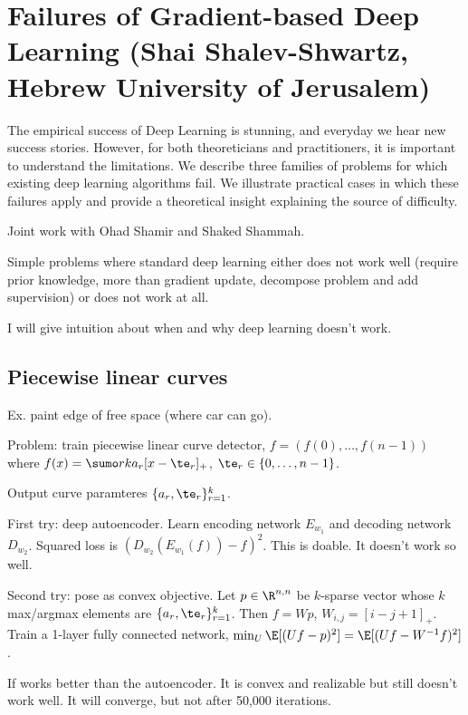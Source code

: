 \section{Failures of Gradient-based Deep Learning (Shai Shalev-Shwartz, Hebrew University of Jerusalem)}

The empirical success of Deep Learning is stunning, and everyday we hear new success stories. However, for both theoreticians and practitioners, it is important to understand the limitations. We describe three families of problems for which existing deep learning algorithms fail. We illustrate practical cases in which these failures apply and provide a theoretical insight explaining the source of difficulty.   
 
Joint work with Ohad Shamir and Shaked Shammah.

Simple problems where standard deep learning either does not work well (require prior knowledge, more than gradient update, decompose problem and add supervision) or does not work at all.

I will give intuition about when and why deep learning doesn't work.

\subsection{Piecewise linear curves}

Ex. paint edge of free space (where car can go).

Problem: train piecewise linear curve detector, $f=(f(0),\ldots, f(n-1))$ where $f(x) = \sumo rk a_r [x-\te_r]_+$, $\te_r\in \{0,\ldots, n-1\}$.

Output curve paramteres $\{a_r,\te_r\}_{r=1}^k$. 

First try: deep autoencoder. Learn encoding network $E_{w_1}$ and decoding network $D_{w_2}$.  Squared loss is $(D_{w_2}(E_{w_1}(f))-f)^2$. This is doable. It doesn't work so well.

Second try: pose as convex objective. Let $p\in \R^{n,n}$ be $k$-sparse vector whose $k$ max/argmax elements are $\{a_r,\te_r\}_{r=1}^k$. Then $f=Wp$, $W_{i,j}=[i-j+1]_+$.  Train a 1-layer fully connected network, $\min_U \E[(Uf-p)^2] = \E[(Uf - W^{-1} f)^2]$.

If works better than the autoencoder. It is convex and realizable but still doesn't work well. It will converge, but not after 50,000 iterations.

